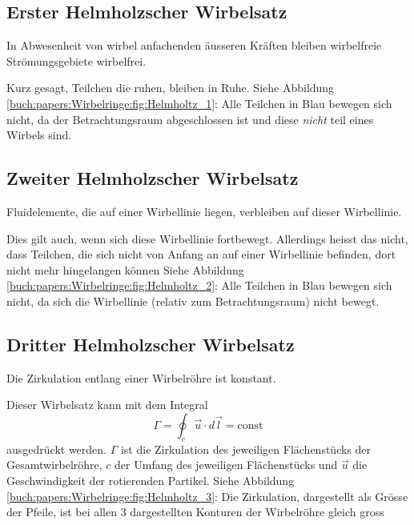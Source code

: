 \subsection{Erster Helmholzscher Wirbelsatz}

\begin{satz}
    In Abwesenheit von wirbel anfachenden äusseren Kräften bleiben wirbelfreie Strömungsgebiete wirbelfrei.
\end{satz}

Kurz gesagt, Teilchen die ruhen, bleiben in Ruhe. 
Siehe Abbildung \ref{buch:papers:Wirbelringe:fig:Helmholtz_1}: 
Alle Teilchen in Blau bewegen sich nicht, da der Betrachtungsraum abgeschlossen ist und diese {\em nicht} teil eines Wirbels sind.

\subsection{Zweiter Helmholzscher Wirbelsatz}

\begin{satz}
    Fluidelemente, die auf einer Wirbellinie liegen, verbleiben auf dieser Wirbellinie.
\end{satz}

Dies gilt auch, wenn sich diese Wirbellinie fortbewegt. 
Allerdings heisst das nicht, dass Teilchen, die sich nicht von Anfang an auf einer Wirbellinie befinden, dort nicht mehr hingelangen können
Siehe Abbildung \ref{buch:papers:Wirbelringe:fig:Helmholtz_2}:  
Alle Teilchen in Blau bewegen sich nicht, da sich die Wirbellinie (relativ zum Betrachtungsraum) nicht bewegt.

\subsection{Dritter Helmholzscher Wirbelsatz}

\begin{satz}
    Die Zirkulation entlang einer Wirbelröhre ist konstant. 
\end{satz}

Dieser Wirbelsatz kann mit dem Integral 
\[
\Gamma
= 
\oint_{c} \vec{u} \cdot d \vec{l}
=
\text{const}
\]
ausgedrückt werden. 
\(\Gamma\) ist die Zirkulation des jeweiligen Flächenstücks der Gesamtwirbelröhre, \(c\) der Umfang des jeweiligen Flächenstücks und \(\vec{u}\) die Geschwindigkeit der rotierenden Partikel. 
Siehe Abbildung \ref{buch:papers:Wirbelringe:fig:Helmholtz_3}: 
Die Zirkulation, dargestellt als Grösse der Pfeile, ist bei allen 3 dargestellten Konturen der Wirbelröhre gleich gross 


